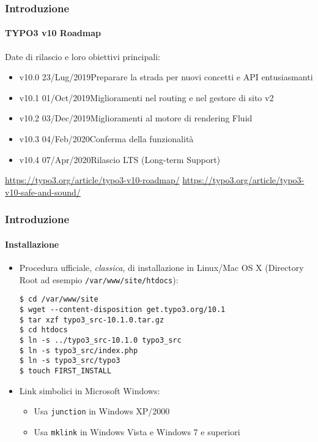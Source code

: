 
\begin{frame}[fragile]
	\frametitle{Introduzione}
	\framesubtitle{TYPO3 v10 Roadmap}

	Date di rilascio e loro obiettivi principali:

	\begin{itemize}

		\item v10.0 \tabto{1.1cm}23/Lug/2019\tabto{3.4cm}Preparare la strada per nuovi concetti e API entusiasmanti
		\item
			\begingroup
				\color{typo3orange}
				v10.1 \tabto{1.1cm}01/Oct/2019\tabto{3.4cm}Miglioramenti nel routing e nel gestore di sito v2
			\endgroup
		\item v10.2 \tabto{1.1cm}03/Dec/2019\tabto{3.4cm}Miglioramenti al motore di rendering Fluid
		\item v10.3 \tabto{1.1cm}04/Feb/2020\tabto{3.4cm}Conferma della funzionalità
		\item v10.4 \tabto{1.1cm}07/Apr/2020\tabto{3.4cm}Rilascio LTS (Long-term Support)

	\end{itemize}

	\smaller
		\url{https://typo3.org/article/typo3-v10-roadmap/}\newline
		\url{https://typo3.org/article/typo3-v10-safe-and-sound/}
	\normalsize

\end{frame}


\begin{frame}[fragile]
	\frametitle{Introduzione}
	\framesubtitle{Installazione}

	\begin{itemize}
		\item Procedura ufficiale, \textit{classica}, di installazione in Linux/Mac OS X\newline
			(Directory Root ad esempio \texttt{/var/www/site/htdocs}):
		\begin{lstlisting}
$ cd /var/www/site
$ wget --content-disposition get.typo3.org/10.1
$ tar xzf typo3_src-10.1.0.tar.gz
$ cd htdocs
$ ln -s ../typo3_src-10.1.0 typo3_src
$ ln -s typo3_src/index.php
$ ln -s typo3_src/typo3
$ touch FIRST_INSTALL
		\end{lstlisting}

		\item Link simbolici in Microsoft Windows:

			\begin{itemize}
				\item Usa \texttt{junction} in Windows XP/2000
				\item Usa \texttt{mklink} in Windows Vista e Windows 7 e superiori
			\end{itemize}

	\end{itemize}
\end{frame}

